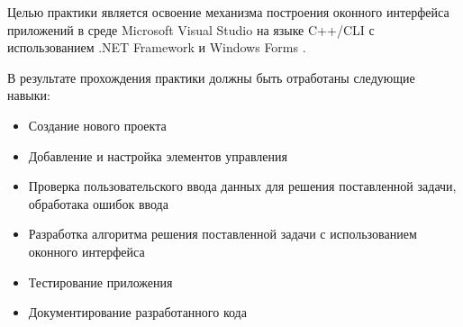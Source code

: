 \intro

Целью практики является освоение механизма построения оконного интерфейса приложений в среде Microsoft Visual Studio на языке C++/CLI с использованием .NET Framework и Windows Forms \cite{cite1}.

В результате прохождения практики должны быть отработаны следующие навыки:

\begin{itemize}
    \item{Создание нового проекта}
    \item{Добавление и настройка элементов управления}
    \item{Проверка пользовательского ввода данных для решения поставленной задачи, обработака ошибок ввода}
    \item{Разработка алгоритма решения поставленной задачи с использованием оконного интерфейса}
    \item{Тестирование приложения}
    \item{Документирование разработанного кода}
\end{itemize}
